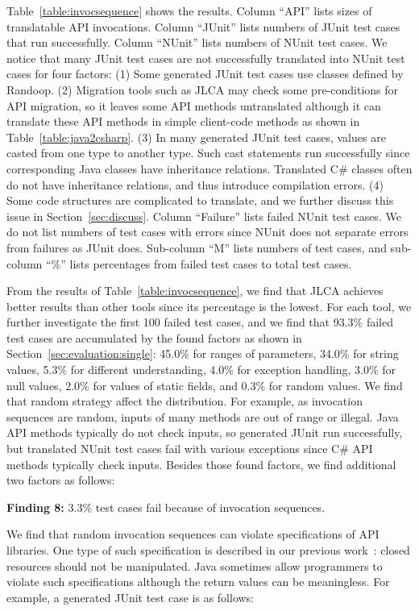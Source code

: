 Table~\ref{table:invocsequence} shows the results. Column ``API'' lists sizes of translatable API invocations. Column ``JUnit'' lists numbers of JUnit test cases that run successfully. Column ``NUnit'' lists numbers of NUnit test cases. We notice that many JUnit test cases are not successfully translated into NUnit test cases for four factors: (1) Some generated JUnit test cases use classes defined by Randoop. (2) Migration tools such as JLCA may check some pre-conditions for API migration, so it leaves some API methods untranslated although it can translate these API methods in simple client-code methods as shown in Table~\ref{table:java2csharp}. (3) In many generated JUnit test cases, values are casted from one type to another type. Such cast statements run successfully since corresponding Java classes have inheritance relations. Translated C\# classes often do not have inheritance relations, and thus introduce compilation errors. (4) Some code structures are complicated to translate, and we further discuss this issue in Section~\ref{sec:discuss}. Column ``Failure'' lists failed NUnit test cases. We do not list numbers of test cases with errors since NUnit does not separate errors from failures as JUnit does. Sub-column ``M'' lists numbers of test cases, and sub-column ``\%'' lists percentages from failed test cases to total test cases.

From the results of Table~\ref{table:invocsequence}, we find that JLCA achieves better results than other tools since its percentage is the lowest. For each tool, we further investigate the first 100 failed test cases, and we find that 93.3\% failed test cases are accumulated by the found factors as shown in Section~\ref{sec:evaluation:single}: 45.0\% for ranges of parameters, 34.0\% for string values, 5.3\% for different understanding, 4.0\% for exception handling, 3.0\% for null values, 2.0\% for values of static fields, and 0.3\% for random values. We find that random strategy affect the distribution. For example, as invocation sequences are random, inputs of many methods are out of range or illegal. Java API methods typically do not check inputs, so generated JUnit run successfully, but translated NUnit test cases fail with various exceptions since C\# API methods typically check inputs. Besides those found factors, we find additional two factors as follows:

\textbf{Finding 8:} 3.3\% test cases fail because of invocation sequences.

We find that random invocation sequences can violate specifications of API libraries. One type of such specification is described in our previous work~\cite{zhong09:inferring}: closed resources should not be manipulated. Java sometimes allow programmers to violate such specifications although the return values can be meaningless. For example, a generated JUnit test case is as follows:

